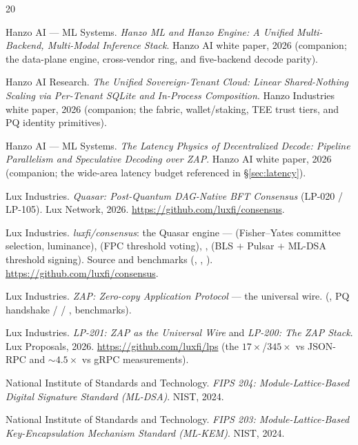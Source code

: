 \documentclass[11pt]{article}
\begin{document}
\begin{thebibliography}{20}
\small

Hanzo AI --- ML Systems. \emph{Hanzo ML and Hanzo Engine: A Unified Multi-Backend, Multi-Modal
Inference Stack}. Hanzo AI white paper, 2026 (companion; the data-plane engine, cross-vendor ring,
and five-backend decode parity).

Hanzo AI Research. \emph{The Unified Sovereign-Tenant Cloud: Linear Shared-Nothing Scaling via
Per-Tenant SQLite and In-Process Composition}. Hanzo Industries white paper, 2026 (companion; the
 fabric, wallet/staking, TEE trust tiers, and PQ identity primitives).

Hanzo AI --- ML Systems. \emph{The Latency Physics of Decentralized Decode: Pipeline Parallelism
and Speculative Decoding over ZAP}. Hanzo AI white paper, 2026 (companion; the wide-area latency
budget referenced in \S\ref{sec:latency}).

Lux Industries. \emph{Quasar: Post-Quantum DAG-Native BFT Consensus} (LP-020 / LP-105). Lux
Network, 2026. \url{https://github.com/luxfi/consensus}.

Lux Industries. \emph{luxfi/consensus}: the Quasar engine ---  (Fisher--Yates
committee selection, luminance),  (FPC threshold voting), ,
 (BLS $+$ Pulsar $+$ ML-DSA threshold signing). Source and benchmarks
(, , ). \url{https://github.com/luxfi/consensus}.

Lux Industries. \emph{ZAP: Zero-copy Application Protocol} --- the universal wire.
 (,  PQ handshake /  /
,  benchmarks).

Lux Industries. \emph{LP-201: ZAP as the Universal Wire} and \emph{LP-200: The ZAP Stack}. Lux
Proposals, 2026. \url{https://github.com/luxfi/lps} (the $17\times$/$345\times$ vs JSON-RPC and
$\sim$$4.5\times$ vs gRPC measurements).

National Institute of Standards and Technology. \emph{FIPS 204: Module-Lattice-Based Digital
Signature Standard (ML-DSA)}. NIST, 2024.

National Institute of Standards and Technology. \emph{FIPS 203: Module-Lattice-Based
Key-Encapsulation Mechanism Standard (ML-KEM)}. NIST, 2024.


\end{thebibliography}
\end{document}
